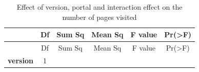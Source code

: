 \documentclass[]{article}
\begin{document}
\begin{longtable}[]{@{}cccccc@{}}
\caption{Effect of version, portal and interaction effect on the number
of pages visited}\tabularnewline
\toprule
\begin{minipage}[b]{0.24\columnwidth}\centering\strut
~\strut
\end{minipage} & \begin{minipage}[b]{0.07\columnwidth}\centering\strut
Df\strut
\end{minipage} & \begin{minipage}[b]{0.10\columnwidth}\centering\strut
Sum Sq\strut
\end{minipage} & \begin{minipage}[b]{0.12\columnwidth}\centering\strut
Mean Sq\strut
\end{minipage} & \begin{minipage}[b]{0.12\columnwidth}\centering\strut
F value\strut
\end{minipage} & \begin{minipage}[b]{0.13\columnwidth}\centering\strut
Pr(\textgreater{}F)\strut
\end{minipage}\tabularnewline
\midrule
\endfirsthead
\toprule
\begin{minipage}[b]{0.24\columnwidth}\centering\strut
~\strut
\end{minipage} & \begin{minipage}[b]{0.07\columnwidth}\centering\strut
Df\strut
\end{minipage} & \begin{minipage}[b]{0.10\columnwidth}\centering\strut
Sum Sq\strut
\end{minipage} & \begin{minipage}[b]{0.12\columnwidth}\centering\strut
Mean Sq\strut
\end{minipage} & \begin{minipage}[b]{0.12\columnwidth}\centering\strut
F value\strut
\end{minipage} & \begin{minipage}[b]{0.13\columnwidth}\centering\strut
Pr(\textgreater{}F)\strut
\end{minipage}\tabularnewline
\midrule
\endhead
\begin{minipage}[t]{0.24\columnwidth}\centering\strut
\textbf{version}\strut
\end{minipage} & \begin{minipage}[t]{0.07\columnwidth}\centering\strut
1\strut
\end{minipage} & \begin{minipage}[t]{0.10\columnwidth}\centering\strut

\end{minipage}
\end{longtable}
\end{document}
